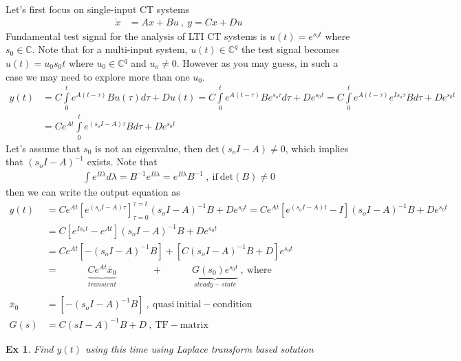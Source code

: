\documentclass[twoside]{article}
\newtheorem{exmp}[theorem]{Ex}
\begin{document}
Let's first focus on single-input CT systems 
%
\begin{align*}
       \dot{x} &= A x + B u \ , \ y = C x + D u
\end{align*}
%
Fundamental test signal for the analysis of LTI CT systems is $u(t) = e^{s_0 t}$ where $s_0 \in \mathbb{C}$. Note that for a multi-input system, $u(t) \in \mathbb{C}^q$ the test signal becomes $u(t) = u_0 s_0 t$ where $u_0 \in \mathbb{C}^q$ and $u_o \neq 0$. However as you may guess, in such a case we may need to explore more than one $u_0$.
%
\begin{align*}
  y(t) &= C \int\limits_{0}^{t} e^{A ( t - \tau ) } B u(\tau) d \tau + D u(t) = C \int\limits_{0}^{t} e^{A ( t - \tau ) } B e^{s_o \tau} d \tau + D e^{s_0 t} = 
  C \int\limits_{0}^{t} e^{A ( t - \tau ) } e^{I   s_o \tau} B d \tau + D e^{s_0 t}
  \\
  &=   C e^{A t} \int\limits_{0}^{t} e^{(s_o I - A)  \tau} B d \tau + D e^{s_0 t}
\end{align*}
%
Let's assume that $s_0$ is not an eigenvalue, then $\mathrm{det}(s_o I - A) \neq 0$, which implies that $(s_o I - A)^{-1}$ exists. Note that
%
\begin{align*}
\int e^{B \lambda} d \lambda = B^{-1} e^{B \lambda} = e^{B \lambda} B^{-1} \ , \ \mathrm{if} \ \mathrm{det}(B) \neq 0
\end{align*}
%
then we can write the output equation as
\begin{align*}
  y(t) &= C e^{A t} \left[ e^{(s_o I - A)  \tau} \right]_{\tau = 0}^{\tau = t} (s_o I - A)^{-1} B + D e^{s_0 t}
  = C e^{A t} \left[ e^{(s_o I - A)  t} - I \right] (s_o I - A)^{-1} B + D e^{s_0 t}
  \\
  &= C \left[ e^{I s_o t} - e^{A t} \right] (s_o I - A)^{-1} B + D e^{s_0 t} 
  \\
  &=  C e^{A t} \left[ - (s_o I - A)^{-1} B \right] +
  \left[ C (s_o I - A)^{-1} B + D \right] e^{s_0 t}
  \\
  &= \quad \quad  \quad  \underbrace{C e^{A t} \bar{x}_0}_{transient}  \quad \quad \quad \ \ \, +
   \quad \quad \quad \underbrace{G(s_0) e^{s_0 t}}_{steady-state} \ , \ \mathrm{where}
   \\
   \\
   \bar{x}_0 &=  \left[ - (s_o I - A)^{-1} B \right] \ , \ \mathrm{quasi} \ \mathrm{initial-condition}
   \\
   G(s) &= C (s I - A)^{-1} B + D \ , \ \mathrm{TF-matrix} 
\end{align*}

\begin{exmp}
 Find $y(t)$ using this time using Laplace transform based solution 
\end{exmp}
\end{document}
